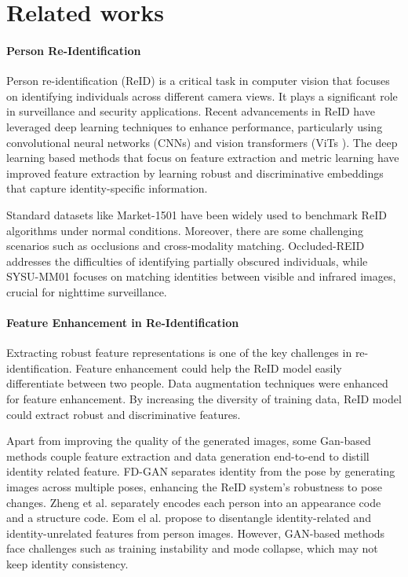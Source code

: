 \section{Related works}
\paragraph{Person Re-Identification}
Person re-identification (ReID) is a critical task in computer vision that focuses on identifying individuals across different camera views. It plays a significant role in surveillance and security applications. Recent advancements in ReID have leveraged deep learning techniques to enhance performance, particularly using convolutional neural networks (CNNs\cite{krizhevsky2012imagenet}) and vision transformers (ViTs \cite{alexey2020image}). The deep learning based methods\cite{bak2010person, layne2012person, sun2017svdnet, hermans2017defense, liao2020interpretable, fu2021unsupervised, zhang2023protohpe, zhang2023pha} that focus on feature extraction and metric learning\cite{koestinger2012large, hirzer2012relaxed, liao2015efficient, yu2018unsupervised} have improved feature extraction by learning robust and discriminative embeddings that capture identity-specific information.

Standard datasets like Market-1501 \cite{zheng2015scalable} have been widely used to benchmark ReID algorithms under normal conditions. Moreover, there are some challenging scenarios such as occlusions and cross-modality matching. Occluded-REID \cite{zhuo2018occluded} addresses the difficulties of identifying partially obscured individuals, while SYSU-MM01 \cite{wu2017rgb} focuses on matching identities between visible and infrared images, crucial for nighttime surveillance.

\paragraph{Feature Enhancement in Re-Identification}
Extracting robust feature representations is one of the key challenges in re-identification. Feature enhancement could help the ReID model easily differentiate between two people. Data augmentation techniques\cite{mclaughlin2015data, zhong2020random, ma2019true} were enhanced for feature enhancement. By increasing the diversity of training data, ReID model could extract robust and discriminative features.

Apart from improving the quality of the generated images, some Gan-based methods couple feature extraction and data generation end-to-end to distill identity related feature. FD-GAN\cite{ge2018fd} separates identity from the pose by generating images across multiple poses, enhancing the ReID system's robustness to pose changes. Zheng et al.\cite{zheng2019joint} separately encodes each person into an appearance code and a structure code. Eom el al.\cite{eom2019learning} propose to disentangle identity-related and identity-unrelated features from person images.  However, GAN-based methods face challenges such as training instability and mode collapse, which may not keep identity consistency.

